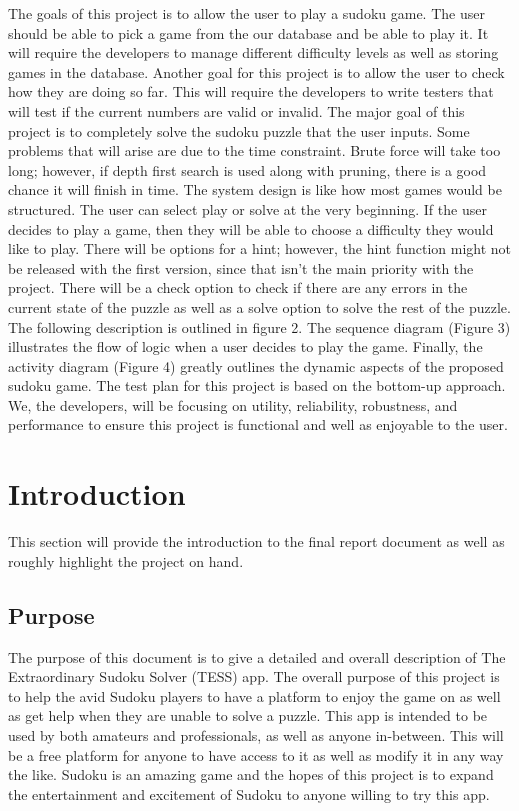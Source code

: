 \documentclass{article}
\begin{document}
	The goals of this project is to allow the user to play a sudoku game. The user should be able to pick a game from the our database and be able to play it. It will require the developers to manage different difficulty levels as well as storing games in the database. Another goal for this project is to allow the user to check how they are doing so far. This will require the developers to write testers that will test if the current numbers are valid or invalid. The major goal of this project is to completely solve the sudoku puzzle that the user inputs. Some problems that will arise are due to the time constraint. Brute force will take too long; however, if depth first search is used along with pruning, there is a good chance it will finish in time.
	The system design is like how most games would be structured. The user can select play or solve at the very beginning. If the user decides to play a game, then they will be able to choose a difficulty they would like to play. There will be options for a hint; however, the hint function might not be released with the first version, since that isn’t the main priority with the project. There will be a check option to check if there are any errors in the current state of the puzzle as well as a solve option to solve the rest of the puzzle.  The following description is outlined in figure 2. The sequence diagram (Figure 3) illustrates the flow of logic when a user decides to play the game. Finally, the activity diagram (Figure 4) greatly outlines the dynamic aspects of the proposed sudoku game.
The test plan for this project is based on the bottom-up approach. We, the developers, will be focusing on utility, reliability, robustness, and performance to ensure this project is functional and well as enjoyable to the user.



 
\section{Introduction}
 This section will provide the introduction to the final report document as well as roughly highlight the project on hand.
\subsection{Purpose}
The purpose of this document is to give a detailed and overall description of The Extraordinary Sudoku Solver (TESS) app. The overall purpose of this project is to help the avid Sudoku players to have a platform to enjoy the game on as well as get help when they are unable to solve a puzzle. This app is intended to be used by both amateurs and professionals, as well as anyone in-between. This will be a free platform for anyone to have access to it as well as modify it in any way the like. Sudoku is an amazing game and the hopes of this project is to expand the entertainment and excitement of Sudoku to anyone willing to try this app.
\end{document}
